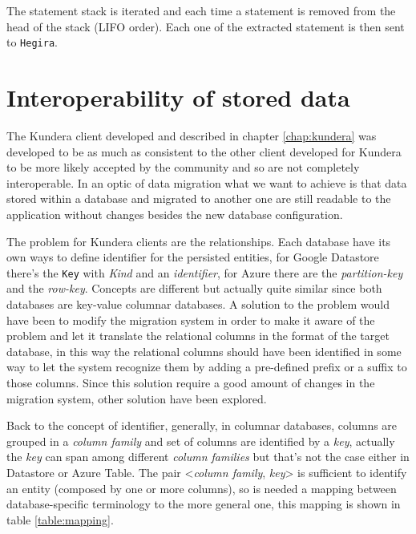 \noindent The statement stack is iterated and each time a statement is removed from the head of the stack (LIFO order). Each one of the extracted statement is then sent to \texttt{Hegira}.


\section{Interoperability of stored data}
The Kundera client developed and described in chapter \ref{chap:kundera} was developed to be as much as consistent to the other client developed for Kundera to be more likely accepted by the community and so are not completely interoperable.
In an optic of data migration what we want to achieve is that data stored within a database and migrated to another one are still readable to the application without changes besides the new database configuration. 

\noindent The problem for Kundera clients are the relationships. Each database have its own ways to define identifier for the persisted entities, for Google Datastore there's the \texttt{Key} with \textit{Kind} and an \textit{identifier}, for Azure there are the \textit{partition-key} and the \textit{row-key}. Concepts are different but actually quite similar since both databases are key-value columnar databases. 
A solution to the problem would have been to modify the migration system in order to make it aware of the problem and let it translate the relational columns in the format of the target database, in this way the relational columns should have been identified in some way to let the system recognize them by adding a pre-defined prefix or a suffix to those columns.
Since this solution require a good amount of changes in the migration system, other solution have been explored.
 
\newparagraph Back to the concept of identifier, generally, in columnar databases, columns are grouped in a \textit{column family} and set of columns are identified by a \textit{key}, actually the \textit{key} can span among different \textit{column families} but that's not the case either in Datastore or Azure Table.
The pair \textless\textit{column family}, \textit{key}\textgreater
is sufficient to identify an entity (composed by one or more columns), so is needed a mapping between database-specific terminology to the more general one, this mapping is shown in table \ref{table:mapping}.

